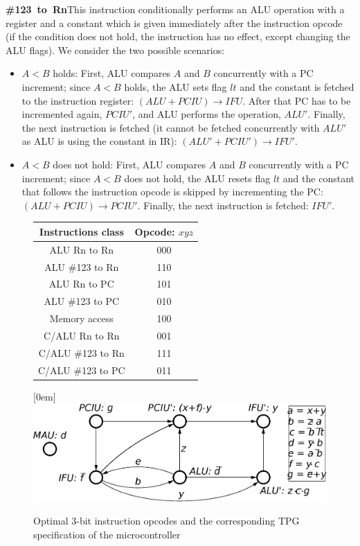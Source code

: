 \textbf{\#123~to~Rn}\quad{}This instruction conditionally performs
an ALU operation with a register and a constant which is given immediately
after the instruction opcode (if the condition does not hold, the
instruction has no effect, except changing the ALU flags). We consider
the two possible scenarios:
\begin{itemize}
\item $A<B$ holds: First, ALU compares $A$ and $B$ concurrently with
a PC increment; since $A<B$ holds, the ALU sets flag $lt$ and the
constant is fetched to the instruction register: $(\mathit{ALU}+\mathit{PCIU})\rightarrow\mathit{IFU}$.
After that PC has to be incremented again, $\mathit{PCIU'}$, and
ALU performs the operation, $\mathit{ALU'}$. Finally, the next instruction
is fetched (it cannot be fetched concurrently with $\mathit{ALU'}$
as ALU is using the constant in IR): $(\mathit{ALU'}+\mathit{PCIU'})\rightarrow\mathit{IFU'}$.
\item $A<B$ does not hold: First, ALU compares $A$ and $B$ concurrently
with a PC increment; since $A<B$ does not hold, the ALU resets flag
$lt$ and the constant that follows the instruction opcode is skipped
by incrementing the PC: $(\mathit{ALU}+\mathit{PCIU})\rightarrow\mathit{PCIU'}$.
Finally, the next instruction is fetched: $\mathit{IFU'}$.
\end{itemize}
\begin{figure}
\centering{}\hspace*{\fill}%
\begin{tabular}{|c||c|}
\hline 
{\small Instructions class} & {\small Opcode: $xyz$}\tabularnewline
\hline 
\hline 
{\small ALU Rn to Rn} & {\small 000}\tabularnewline
\hline 
{\small ALU \#123 to Rn} & {\small 110}\tabularnewline
\hline 
{\small ALU Rn to PC} & {\small 101}\tabularnewline
\hline 
{\small ALU \#123 to PC} & {\small 010}\tabularnewline
\hline 
{\small Memory access} & {\small 100}\tabularnewline
\hline 
{\small C/ALU Rn to Rn} & {\small 001}\tabularnewline
\hline 
{\small C/ALU \#123 to Rn} & {\small 111}\tabularnewline
\hline 
{\small C/ALU \#123 to PC} & {\small 011}\tabularnewline
\hline 
\end{tabular}\hspace*{\fill}\raisebox{-5em}[0em]{\includegraphics[scale=0.5]{fig/CPOG_L_3}}\hspace*{\fill}\caption{Optimal 3-bit instruction opcodes and the corresponding TPG specification
of the microcontroller\label{fig:opcodes-and-CG}}
\vspace{-6mm}
\end{figure}


